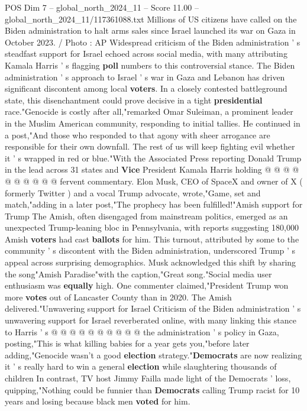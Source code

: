 \begin{textsample}{POS Dim 7 – global\_north\_2024\_11 – Score 11.00 – global\_north\_2024\_11/117361088.txt}  \label{ex:f7_pos_115}
Millions of US citizens have called on the Biden administration to halt arms sales since Israel launched its war on Gaza in October 2023. / Photo : AP Widespread criticism of the Biden administration ' s steadfast support for Israel echoed across social media, with many attributing Kamala Harris ' s flagging \textbf{poll} numbers to this controversial stance.
The Biden administration ' s approach to Israel ' s war in Gaza and Lebanon has driven significant discontent among local \textbf{voters}.
In a closely contested battleground state, this disenchantment could prove decisive in a tight \textbf{presidential} race."Genocide is costly after all,"remarked Omar Suleiman, a prominent leader in the Muslim American community, responding to initial tallies.
He continued in a post,"And those who responded to that agony with sheer arrogance are responsible for their own downfall.
The rest of us will keep fighting evil whether it ' s wrapped in red or blue."With the Associated Press reporting Donald Trump in the lead across 31 states and \textbf{Vice} President Kamala Harris holding @ @ @ @ @ @ @ @ @ @ fervent commentary.
Elon Musk, CEO of SpaceX and owner of X ( formerly Twitter ) and a vocal Trump advocate, wrote,"Game, set and match,"adding in a later post,"The prophecy has been fulfilled!"Amish support for Trump The Amish, often disengaged from mainstream politics, emerged as an unexpected Trump-leaning bloc in Pennsylvania, with reports suggesting 180,000 Amish \textbf{voters} had cast \textbf{ballots} for him.
This turnout, attributed by some to the community ' s discontent with the Biden administration, underscored Trump ' s appeal across surprising demographics.
Musk acknowledged this shift by sharing the song"Amish Paradise"with the caption,"Great song."Social media user enthusiasm was \textbf{equally} high.
One commenter claimed,"President Trump won more \textbf{votes} out of Lancaster County than in 2020.
The Amish delivered."Unwavering support for Israel Criticism of the Biden administration ' s unwavering support for Israel reverberated online, with many linking this stance to Harris ' s @ @ @ @ @ @ @ @ @ @ the administration ' s policy in Gaza, posting,"This is what killing babies for a year gets you,"before later adding,"Genocide wasn't a good \textbf{election} strategy."\textbf{Democrats} are now realizing it ' s really hard to win a general \textbf{election} while slaughtering thousands of children In contrast, TV host Jimmy Failla made light of the Democrats ' loss, quipping,"Nothing could be funnier than \textbf{Democrats} calling Trump racist for 10 years and losing because black men \textbf{voted} for him.

\end{textsample}
